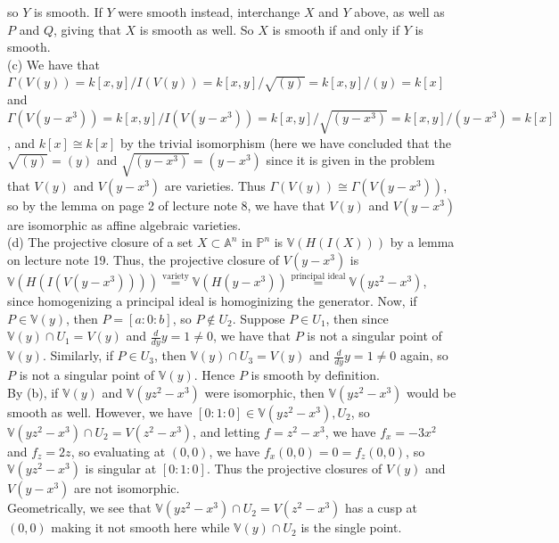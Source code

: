 \documentclass[a4paper]{article}
\begin{document}
 so $Y$ is smooth. If $Y$ were smooth instead, interchange $X$ and $Y$ above,
 as well as $P$ and $Q$, giving that $X$ is smooth as well. So
 $X$ is smooth if and only if $Y$ is smooth.\\
 \linebreak
 (c) We have that
 $\Gamma \left( V(y) \right) 
 = k\left[ x,y \right] / I(V(y)) 
 = k\left[ x,y \right] / \sqrt{(y)} 
 = k\left[ x,y \right] / (y)
 = k\left[ x \right] $ and
 $\Gamma\left( V(y-x^3) \right) 
 = k\left[ x,y \right] / I \left( V\left( y-x^3 \right)  \right) 
 = k\left[ x,y \right] / \sqrt{(y-x^3)} 
 = k\left[ x,y \right] / \left( y-x^3 \right) 
 = k\left[ x \right] $, and
 $k\left[ x \right] \cong k\left[ x \right] $ by the trivial isomorphism (here
 we have concluded that the $\sqrt{(y)} = (y)$ and
 $\sqrt{(y-x^3)}  = (y-x^3)$ since it is given in the problem that
 $V(y)$ and $V(y-x^3)$ are varieties. Thus
 $\Gamma(V(y)) \cong \Gamma\left( V(y-x^3) \right) $, so by the lemma
 on page 2 of lecture note 8, we have that
 $V(y)$ and $V(y-x^3)$ are isomorphic as affine algebraic varieties.\\
 \linebreak
 (d) The projective closure of a set $X \subset \mathbb{A}^{n}$ in
 $\mathbb{P}^{n}$ is $\mathbb{V}\left( H\left( I(X) \right)  \right) $ by
 a lemma on lecture note 19.
 Thus, the projective closure of $V\left( y-x^3 \right) $ is
 $\mathbb{V}\left( H \left( I\left( V(y-x^3) \right)  \right)  \right) 
 \stackrel{\text{variety}}{=} \mathbb{V}(H(y-x^3))
 \stackrel{\text{principal ideal}}{=}
 \mathbb{V}\left( yz^2 - x^3 \right) $, since homogenizing a principal ideal is
 homoginizing the generator. Now, if $P \in \mathbb{V}(y)$, then
 $P = \left[ a: 0 : b \right] $, so
 $P \not\in U_2$. Suppose $P \in U_1$, then
 since $\mathbb{V}(y) \cap U_1 = V(y)$ and
 $\frac{d}{dy} y = 1 \neq 0$, we have that $P$ is not a singular point
 of $\mathbb{V}(y)$. Similarly, if $P \in U_3$, then
 $\mathbb{V}(y) \cap U_3 = V(y)$ and
 $\frac{d}{dy} y = 1 \neq 0$ again, so $P$ is not a singular point of
 $\mathbb{V}(y)$. Hence $P$ is smooth by definition.\\
 By (b), if $\mathbb{V}(y)$ and $\mathbb{V}(yz^2 - x^3)$ were isomorphic, then
 $\mathbb{V}(yz^2 - x^3)$ would be smooth as well. However, we have
 $\left[ 0 : 1 : 0 \right] \in \mathbb{V}(yz^2 - x^3), U_2$, so
 $\mathbb{V}\left( yz^2 - x^3 \right) \cap U_2
 = V(z^2 - x^3)$, and letting $f = z^2 - x^3$, we have
 $f_x = -3x^2$ and $f_z = 2z$, so
 evaluating at $(0,0)$, we have
 $f_x (0,0) = 0 = f_z (0,0)$, so
 $\mathbb{V}(yz^2 - x^3)$ is singular at $\left[ 0:1:0 \right] $. Thus
 the projective closures of $V(y)$ and $V(y -x^3)$ are not isomorphic.\\
 Geometrically, we see that $\mathbb{V}(yz^2 - x^3) \cap 
 U_2 = V(z^2 - x^3)$ has a cusp at $(0,0)$ making it not smooth here while
 $\mathbb{V}(y) \cap U_2$ is the single point.
\end{document}
